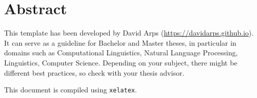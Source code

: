 
\section*{Abstract}

This template has been developed by David Arps (\url{https://davidarps.github.io}). 
It can serve as a guideline for Bachelor and Master theses, in particular in domains such as Computational Linguistics, Natural Language Processing, Linguistics, Computer Science. 
Depending on your subject, there might be different best practices, so check with your thesis advisor.

This document is compiled using \texttt{xelatex}. 
